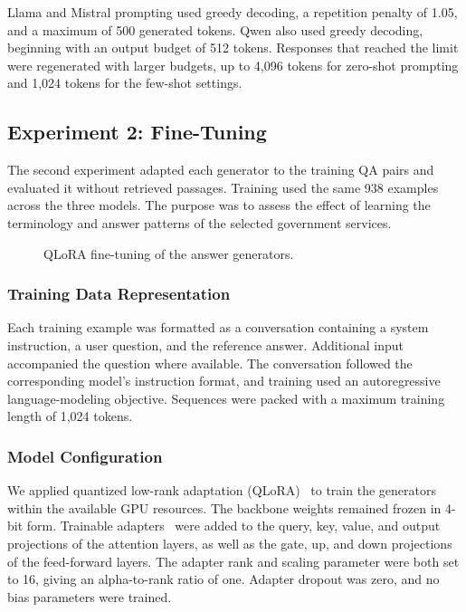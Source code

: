 \documentclass[10pt,journal,compsoc]{IEEEtran}
\begin{document}
Llama and Mistral prompting used greedy decoding, a repetition penalty of 1.05, and a maximum of 500 generated tokens. Qwen also used greedy decoding, beginning with an output budget of 512 tokens. Responses that reached the limit were regenerated with larger budgets, up to 4,096 tokens for zero-shot prompting and 1,024 tokens for the few-shot settings.

\subsection{Experiment 2: Fine-Tuning}
\label{exp:2}

The second experiment adapted each generator to the training QA pairs and evaluated it without retrieved passages. Training used the same 938 examples across the three models. The purpose was to assess the effect of learning the terminology and answer patterns of the selected government services.

\begin{figure}[!t]
\centering
\caption{QLoRA fine-tuning of the answer generators.}
\label{fig:qlora_training}
\end{figure}

\subsubsection{Training Data Representation}

Each training example was formatted as a conversation containing a system instruction, a user question, and the reference answer. Additional input accompanied the question where available. The conversation followed the corresponding model's instruction format, and training used an autoregressive language-modeling objective. Sequences were packed with a maximum training length of 1,024 tokens.

\subsubsection{Model Configuration}

We applied quantized low-rank adaptation (QLoRA)~\cite{meth_dettmers2023qlora} to train the generators within the available GPU resources. The backbone weights remained frozen in 4-bit form. Trainable adapters~\cite{meth_hu2022lora} were added to the query, key, value, and output projections of the attention layers, as well as the gate, up, and down projections of the feed-forward layers. The adapter rank and scaling parameter were both set to 16, giving an alpha-to-rank ratio of one. Adapter dropout was zero, and no bias parameters were trained.
\end{document}
